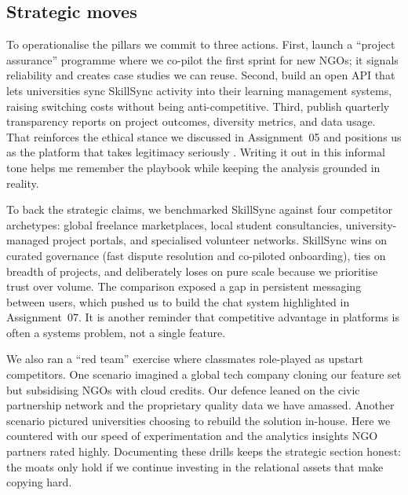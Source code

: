 \subsection*{Strategic moves}
To operationalise the pillars we commit to three actions. First, launch a ``project assurance'' programme where we co-pilot the first sprint for new NGOs; it signals reliability and creates case studies we can reuse. Second, build an open API that lets universities sync SkillSync activity into their learning management systems, raising switching costs without being anti-competitive. Third, publish quarterly transparency reports on project outcomes, diversity metrics, and data usage. That reinforces the ethical stance we discussed in Assignment~05 and positions us as the platform that takes legitimacy seriously \citep{Srnicek2017,Zuboff2019}. Writing it out in this informal tone helps me remember the playbook while keeping the analysis grounded in reality.

To back the strategic claims, we benchmarked SkillSync against four competitor archetypes: global freelance marketplaces, local student consultancies, university-managed project portals, and specialised volunteer networks. SkillSync wins on curated governance (fast dispute resolution and co-piloted onboarding), ties on breadth of projects, and deliberately loses on pure scale because we prioritise trust over volume. The comparison exposed a gap in persistent messaging between users, which pushed us to build the chat system highlighted in Assignment~07. It is another reminder that competitive advantage in platforms is often a systems problem, not a single feature.

We also ran a ``red team'' exercise where classmates role-played as upstart competitors. One scenario imagined a global tech company cloning our feature set but subsidising NGOs with cloud credits. Our defence leaned on the civic partnership network and the proprietary quality data we have amassed. Another scenario pictured universities choosing to rebuild the solution in-house. Here we countered with our speed of experimentation and the analytics insights NGO partners rated highly. Documenting these drills keeps the strategic section honest: the moats only hold if we continue investing in the relational assets that make copying hard.
